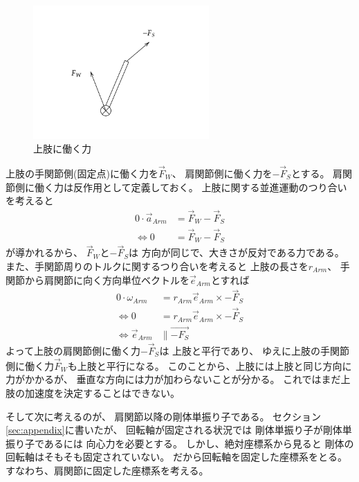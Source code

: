 \documentclass[a4paper,11pt]{jsarticle}
\begin{document}
\begin{figure}[h]
  \centering
  \includegraphics[width = 0.6\textwidth]{F_arm_config.png}
  \caption{上肢に働く力}
  \label{F_arm_config.png}
\end{figure}

上肢の手関節側(固定点)に働く力を$\vec{F}_W$、
肩関節側に働く力を$-\vec{F}_S$とする。
肩関節側に働く力は反作用として定義しておく。
上肢に関する並進運動のつり合いを考えると
\begin{align*}
  0 \cdot \vec{a}_{Arm} &= \vec{F}_W - \vec{F}_S
  \\
  \Leftrightarrow
  0 &= \vec{F}_W - \vec{F}_S
\end{align*}
が導かれるから、
$\vec{F}_W$と$-\vec{F}_S$は
方向が同じで、大きさが反対である力である。
また、手関節周りのトルクに関するつり合いを考えると
上肢の長さを$r_{Arm}$、
手関節から肩関節に向く方向単位ベクトルを$\vec{e}_{Arm}$とすれば
\begin{align*}
  0 \cdot \omega_{Arm} &= r_{Arm} \vec{e}_{Arm} \times -\vec{F}_S
  \\
  \Leftrightarrow
  0 &= r_{Arm} \vec{e}_{Arm} \times -\vec{F}_S
  \\
  \Leftrightarrow
  \vec{e}_{Arm} &\parallel \vec{-F_S}
\end{align*}
よって上肢の肩関節側に働く力$-\vec{F}_S$は
上肢と平行であり、
ゆえに上肢の手関節側に働く力$\vec{F}_W$も上肢と平行になる。
このことから、上肢には上肢と同じ方向に力がかかるが、
垂直な方向には力が加わらないことが分かる。
これではまだ上肢の加速度を決定することはできない。

そして次に考えるのが、
肩関節以降の剛体単振り子である。
セクション\ref{sec:appendix}に書いたが、
回転軸が固定される状況では
剛体単振り子が剛体単振り子であるには
向心力を必要とする。
しかし、絶対座標系から見ると
剛体の回転軸はそもそも固定されていない。
だから回転軸を固定した座標系をとる。
すなわち、肩関節に固定した座標系を考える。
\end{document}
